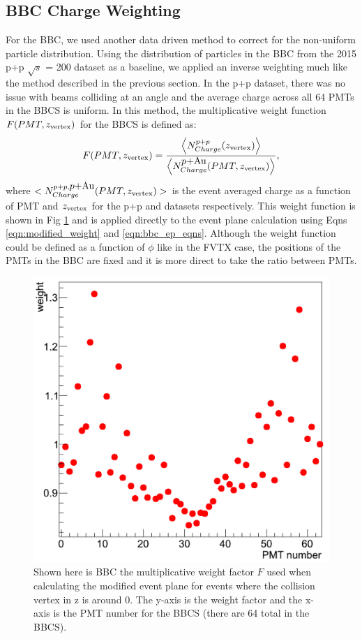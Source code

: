 \subsection{BBC Charge Weighting}
\label{sec:bbc_charge_weight}
For the BBC, we used another data driven method to correct for the non-uniform particle distribution. Using the distribution of particles in the BBC from the 2015 p+p $\sqrt{s}$ = 200 dataset as a baseline, we applied an inverse weighting much like the method described in the previous section. In the p+p dataset, there was no issue with beams colliding at an angle and the average charge across all 64 PMTs in the BBCS is uniform. In this method, the multiplicative weight function $F(PMT,z_{\rm vertex})$ for the BBCS is defined as:
\begin{equation}
F(PMT,z_{\rm vertex}) = \frac{\left<N^{p+p}_{Charge}(z_{\rm vertex})\right>}{\left<N^{\mbox{$p$+Au}}_{Charge}(PMT,z_{\rm vertex})\right>},
\end{equation}
where $<N^{p+p,\mbox{$p$+Au}}_{Charge}(PMT,z_{\rm vertex})>$ is the event averaged charge as a function of PMT and $z_{\rm vertex}$ for the p+p and \pau datasets respectively. 
This weight function is shown in Fig \ref{fig:bbc_weight_function} and is applied directly to the event plane calculation using Eqns \ref{eqn:modified_weight} and \ref{eqn:bbc_ep_eqns}. 
Although the weight function could be defined as a function of $\phi$ like in the FVTX case, the positions of the PMTs in the BBC are fixed and it is more direct to take the ratio between PMTs.

\begin{figure}[h!]
\begin{center}
\includegraphics[width=0.5\linewidth]{figs/pmt_ratio_weight.png}
\caption{Shown here is BBC the multiplicative weight factor $F$ used when calculating the modified event plane for events where the collision vertex in z is around 0. The y-axis is the weight factor and the x-axis is the PMT number for the BBCS (there are 64 total in the BBCS). }
\label{fig:bbc_weight_function}
\end{center}
\end{figure}

